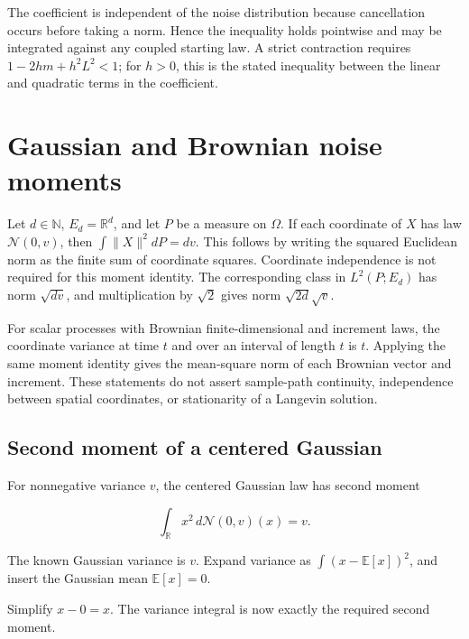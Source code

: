 \documentclass[11pt,a4paper]{report}
\begin{document}
The coefficient is independent of the noise distribution because cancellation occurs before taking a norm. Hence the inequality holds pointwise and may be integrated against any coupled starting law. A strict contraction requires \(1-2hm+h^2L^2<1\); for \(h>0\), this is the stated inequality between the linear and quadratic terms in the coefficient.

\section{\texorpdfstring{Gaussian and Brownian noise moments}{Gaussian and Brownian noise moments}}
\label{proof-module-UnadjustedLangevin-GaussianMoments-lean}


Let \(d\in\mathbb N\), \(E_d=\mathbb R^d\), and let \(P\) be a measure on \(\Omega\). If each coordinate of \(X\) has law \(\mathcal N(0,v)\), then \(\int\|X\|^2dP=dv\). This follows by writing the squared Euclidean norm as the finite sum of coordinate squares. Coordinate independence is not required for this moment identity. The corresponding class in \(L^2(P;E_d)\) has norm \(\sqrt{dv}\), and multiplication by \(\sqrt2\) gives norm \(\sqrt{2d}\sqrt v\).



For scalar processes with Brownian finite-dimensional and increment laws, the coordinate variance at time \(t\) and over an interval of length \(t\) is \(t\). Applying the same moment identity gives the mean-square norm of each Brownian vector and increment. These statements do not assert sample-path continuity, independence between spatial coordinates, or stationarity of a Langevin solution.

\subsection{\texorpdfstring{Second moment of a centered Gaussian}{Second moment of a centered Gaussian}}
\label{report-step-UnadjustedLangevin-GaussianMoments-lean-1}


For nonnegative variance \(v\), the centered Gaussian law has second moment

\[\int_{\mathbb R}x^2\,d\mathcal N(0,v)(x)=v.\]

The known Gaussian variance is \(v\). Expand variance as \(\int(x-\mathbb E[x])^2\), and insert the Gaussian mean \(\mathbb E[x]=0\).



Simplify \(x-0=x\). The variance integral is now exactly the required second moment.
\end{document}

